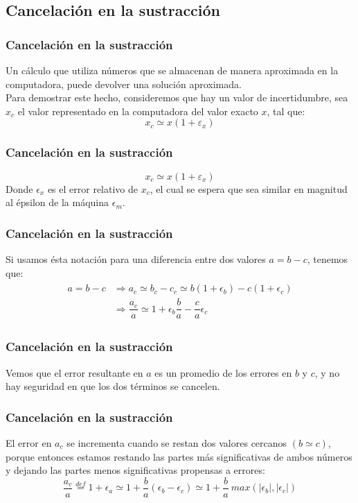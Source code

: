 \subsection{Cancelación en la sustracción}
\begin{frame}
\frametitle{Cancelación en la sustracción}
Un cálculo que utiliza números que se almacenan de manera aproximada en la computadora, puede devolver una solución aproximada.
\\
\bigskip
Para demostrar este hecho, consideremos que hay un valor de incertidumbre, sea $x_{c}$ el valor representado en la computadora del valor exacto $x$, tal que:
\begin{equation}
x_{c} \simeq  x( 1 + \varepsilon_{x})
\label{eq:ecuacion_02_05}
\end{equation}
\end{frame}
\begin{frame}
\frametitle{Cancelación en la sustracción}
\begin{equation*}
x_{c} \simeq  x( 1 + \varepsilon_{x})
\end{equation*}
Donde $\epsilon_{x}$ es el error relativo de $x_{c}$, el cual se espera que sea similar en magnitud al épsilon de la máquina $\epsilon_{m}$.
\end{frame}
\begin{frame}
\frametitle{Cancelación en la sustracción}
Si usamos ésta notación para una diferencia entre dos valores $a = b - c$, tenemos que:
\begin{align}
\begin{aligned}
a = b - c & \Rightarrow a_{c} \simeq b_{c} - c_{c} \simeq b(1 + \epsilon_{b}) - c(1 + \epsilon_{c}) \\
{} & \Rightarrow \dfrac{a_{c}}{a} \simeq 1 + \epsilon_{b} \dfrac{b}{a} - \dfrac{c}{a} \epsilon_{c}
\end{aligned}
\label{eq:ecuacion:02_06}
\end{align} 
\end{frame}
\begin{frame}
\frametitle{Cancelación en la sustracción}
Vemos que el error resultante en $a$ es un promedio de los errores en $b$ y $c$, y no hay seguridad en que los dos términos se cancelen.
\end{frame}
\begin{frame}
\frametitle{Cancelación en la sustracción}
El error en $a_{c}$ se incrementa cuando se restan dos valores cercanos $(b \simeq c)$, porque entonces estamos restando las partes más significativas de ambos números y dejando las partes menos significativas propensas a errores:
\begin{equation}
\dfrac{a_{c}}{a} \stackrel{def}{=} 1 + \epsilon_{a} \simeq 1 + \dfrac{b}{a}(\epsilon_{b} - \epsilon_{c}) \simeq 1 + \dfrac{b}{a} \: max(\vert \epsilon_{b} \vert, \vert \epsilon_{c} \vert) 
\label{eq:ecuacion_02_07}
\end{equation}
\end{frame}
